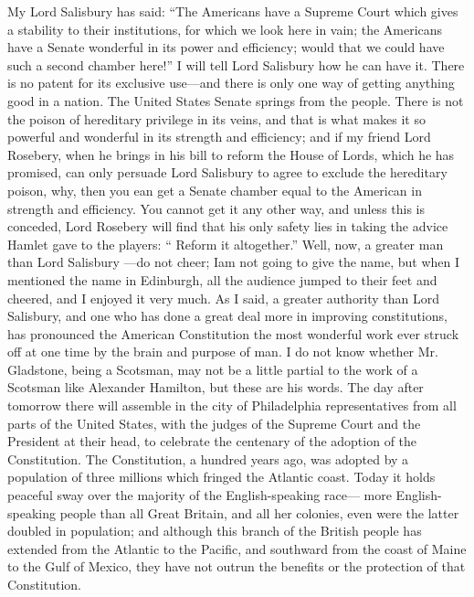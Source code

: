 \documentclass[11pt,openany]{book}
\begin{document}
My Lord Salisbury has said: ``The Americans have a Supreme Court which gives a stability to their institutions, for which we look here in vain; the Americans have a Senate wonderful in its power and efficiency; would that we could have such a second chamber here!'' I will tell Lord Salisbury how he can have it. There is no patent for its exclusive use---and there is only one way of getting anything good in a nation. The United States Senate springs from the people. There is not the poison of hereditary privilege in its veins, and that is what makes it so powerful and wonderful in its strength and efficiency; and if my friend Lord Rosebery, when he brings in his bill to reform the House of Lords, which he has promised, can only persuade Lord Salisbury to agree to exclude the hereditary poison, why, then you ean get a Senate chamber equal to the American in strength and efficiency. You cannot get it any other way, and unless this is conceded, Lord Rosebery will find that his only safety lies in taking the advice Hamlet gave to the players: `` Reform it altogether.'' Well, now, a greater man than Lord Salisbury ---do not cheer; Iam not going to give the name, but when I mentioned the name in Edinburgh, all the audience jumped to their feet and cheered, and I enjoyed it very much. As I said, a greater authority than Lord Salisbury, and one who has done a great deal more in improving constitutions, has pronounced the American Constitution the most wonderful work ever struck off at one time by the brain and purpose of man. I do not know whether Mr. Gladstone, being a Scotsman, may not be a little partial to the work of a Scotsman like Alexander Hamilton, but these are his words. The day after tomorrow there will assemble in the city of Philadelphia representatives from all parts of the United States, with the judges of the Supreme Court and the President at their head, to celebrate the centenary of the adoption of the Constitution. The Constitution, a hundred years ago, was adopted by a population of three millions which fringed the Atlantic coast. Today it holds peaceful sway over the majority of the English-speaking race--- more English-speaking people than all Great Britain, and all her colonies, even were the latter doubled in population; and although this branch of the British people has extended from the Atlantic to the Pacific, and southward from the coast of Maine to the Gulf of Mexico, they have not outrun the benefits or the protection of that Constitution.
\end{document}
